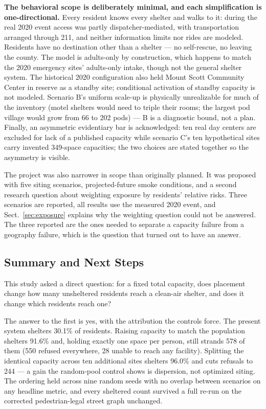 \documentclass[graybox]{svmult}
\begin{document}
\textbf{The behavioral scope is deliberately minimal, and each simplification
is one-directional.} Every resident knows every shelter and walks to it:
during the real 2020 event access was partly dispatcher-mediated, with
transportation arranged through 211, and neither information limits nor rides
are modeled. Residents have no destination other than a shelter --- no
self-rescue, no leaving the county. The model is adults-only by construction,
which happens to match the 2020 emergency sites' adults-only intake, though
not the general shelter system. The historical 2020 configuration also held
Mount Scott Community Center in reserve as a standby site; conditional
activation of standby capacity is not modeled. Scenario B's uniform scale-up
is physically unrealizable for much of the inventory (motel shelters would
need to triple their rooms; the largest pod village would grow from 66 to 202
pods) --- B is a diagnostic bound, not a plan. Finally, an asymmetric
evidentiary bar is acknowledged: ten real day centers are excluded for lack of
a published capacity while scenario C's ten hypothetical sites carry invented
349-space capacities; the two choices are stated together so the asymmetry is
visible.

The project was also narrower in scope than originally planned. It was proposed
with five siting scenarios, projected-future smoke conditions, and a second
research question about weighting exposure by residents' relative risks. Three
scenarios are reported, all results use the measured 2020 event, and
Sect.~\ref{sec:exposure} explains why the weighting question could not be
answered. The three reported are the ones needed to separate a capacity failure
from a geography failure, which is the question that turned out to have an
answer.

\subsection{Summary and Next Steps}
\label{sec:summary}

This study asked a direct question: for a fixed total capacity, does placement
change how many unsheltered residents reach a clean-air shelter, and does it
change which residents reach one?

The answer to the first is yes, with the attribution the controls force. The
present system shelters 30.1\% of residents. Raising capacity to match the
population shelters 91.6\% and, holding exactly one space per person, still
strands 578 of them (550 refused everywhere, 28 unable to reach any facility).
Splitting the identical capacity across ten additional sites shelters 96.0\%
and cuts refusals to 244 --- a gain the random-pool control shows is
dispersion, not optimized siting. The ordering held across nine random seeds
with no overlap between scenarios on any headline metric, and every sheltered
count survived a full re-run on the corrected pedestrian-legal street graph
unchanged.
\end{document}
